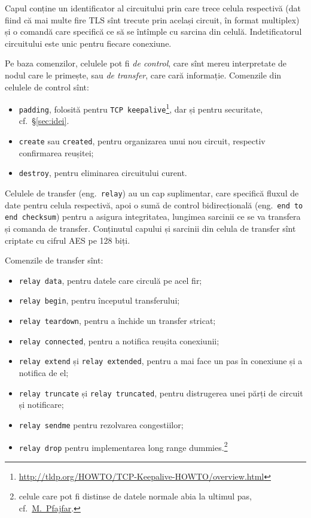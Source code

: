 Capul conține un identificator al circuitului prin care trece celula respectivă
(dat fiind că mai multe fire TLS sînt trecute prin același circuit, în format
multiplex) și o comandă care specifică ce să se întîmple cu sarcina
din celulă. Indetificatorul circuitului este unic pentru fiecare conexiune.

Pe baza comenzilor, celulele pot fi \emph{de control}, care sînt mereu
interpretate de nodul care le primește, sau \emph{de transfer}, care
cară informație.  
Comenzile din celulele de control sînt:
\begin{itemize}
  \item \texttt{padding}, folosită pentru \texttt{TCP keepalive}\footnote{\url{http://tldp.org/HOWTO/TCP-Keepalive-HOWTO/overview.html}}, dar și pentru securitate, cf.\ \S\ref{sec:idei}.
  \item \texttt{create} sau \texttt{created}, pentru organizarea unui
    nou circuit, respectiv confirmarea reușitei;
  \item \texttt{destroy}, pentru eliminarea circuitului curent.
\end{itemize}

Celulele de transfer (eng.\ \texttt{relay}) au un cap suplimentar, care
specifică fluxul de date pentru celula respectivă, apoi o sumă de
control bidirecțională (eng.\ \texttt{end to end check\-sum}) pentru a
asigura integritatea, lungimea sarcinii ce se va transfera și comanda
de transfer. Conținutul capului și sarcinii din celula de transfer
sînt criptate cu cifrul AES pe 128 biți.

Comenzile de transfer sînt:
\begin{itemize}
  \item \texttt{relay data}, pentru datele care circulă pe acel fir;
  \item \texttt{relay begin}, pentru începutul transferului;
  \item \texttt{relay teardown}, pentru a închide un transfer stricat;
  \item \texttt{relay connected}, pentru a notifica reușita conexiunii;
  \item \texttt{relay extend} și \texttt{relay extended}, pentru a mai
    face un pas în conexiune și a notifica de el;
  \item \texttt{relay truncate} și \texttt{relay truncated}, pentru distrugerea
    unei părți de circuit și notificare;
  \item \texttt{relay sendme} pentru rezolvarea congestiilor;
  \item \texttt{relay drop} pentru implementarea long range dummies.\footnote{celule %
       care pot fi distinse de datele normale abia
    la ultimul pas, cf.\ \href{https://lists.torproject.org/pipermail/tor-dev/2002-July/001127.html}{M.\ Pfajfar}.}
\end{itemize}

